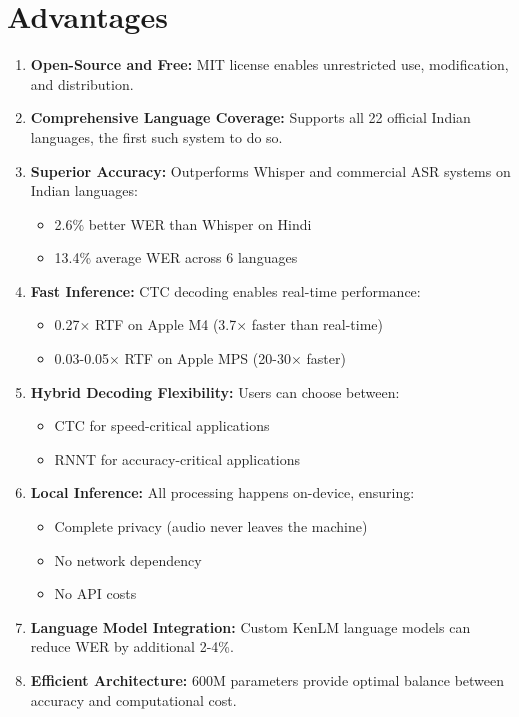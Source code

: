\documentclass[12pt,a4paper]{article}
\begin{document}
\section{Advantages}

\begin{enumerate}[leftmargin=*]
\item \textbf{Open-Source and Free:} MIT license enables unrestricted use, modification, and distribution.

\item \textbf{Comprehensive Language Coverage:} Supports all 22 official Indian languages, the first such system to do so.

\item \textbf{Superior Accuracy:} Outperforms Whisper and commercial ASR systems on Indian languages:
  \begin{itemize}
  \item 2.6\% better WER than Whisper on Hindi
  \item 13.4\% average WER across 6 languages
  \end{itemize}

\item \textbf{Fast Inference:} CTC decoding enables real-time performance:
  \begin{itemize}
  \item 0.27$\times$ RTF on Apple M4 (3.7$\times$ faster than real-time)
  \item 0.03-0.05$\times$ RTF on Apple MPS (20-30$\times$ faster)
  \end{itemize}

\item \textbf{Hybrid Decoding Flexibility:} Users can choose between:
  \begin{itemize}
  \item CTC for speed-critical applications
  \item RNNT for accuracy-critical applications
  \end{itemize}

\item \textbf{Local Inference:} All processing happens on-device, ensuring:
  \begin{itemize}
  \item Complete privacy (audio never leaves the machine)
  \item No network dependency
  \item No API costs
  \end{itemize}

\item \textbf{Language Model Integration:} Custom KenLM language models can reduce WER by additional 2-4\%.

\item \textbf{Efficient Architecture:} 600M parameters provide optimal balance between accuracy and computational cost.
\end{enumerate}
\end{document}
